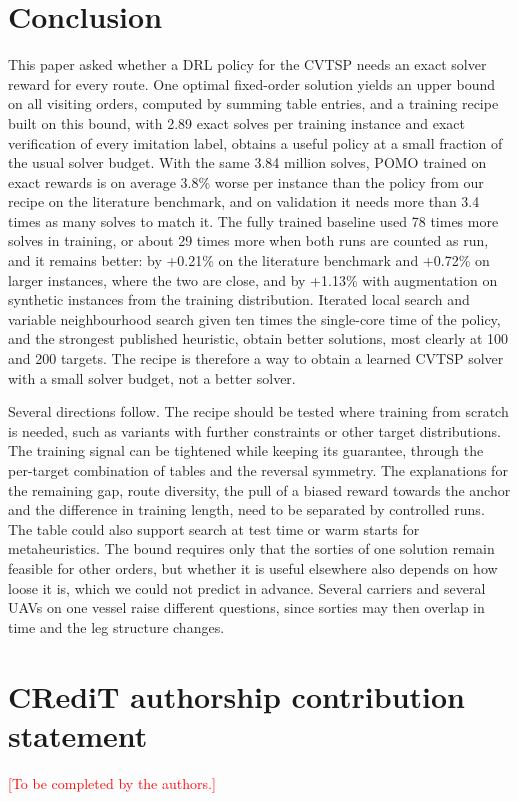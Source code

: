 \documentclass[preprint,12pt,authoryear]{elsarticle}
\newcommand{\placeholder}[1]{\textcolor{red}{[#1]}}
\begin{document}
\section{Conclusion}
\label{sec:conclusion}

This paper asked whether a DRL policy for the CVTSP needs an exact solver reward for every route. One optimal fixed-order solution yields an upper bound on all visiting orders, computed by summing table entries, and a training recipe built on this bound, with 2.89 exact solves per training instance and exact verification of every imitation label, obtains a useful policy at a small fraction of the usual solver budget. With the same 3.84 million solves, POMO trained on exact rewards is on average 3.8\% worse per instance than the policy from our recipe on the literature benchmark, and on validation it needs more than 3.4 times as many solves to match it. The fully trained baseline used 78 times more solves in training, or about 29 times more when both runs are counted as run, and it remains better: by +0.21\% on the literature benchmark and +0.72\% on larger instances, where the two are close, and by +1.13\% with augmentation on synthetic instances from the training distribution. Iterated local search and variable neighbourhood search given ten times the single-core time of the policy, and the strongest published heuristic, obtain better solutions, most clearly at 100 and 200 targets. The recipe is therefore a way to obtain a learned CVTSP solver with a small solver budget, not a better solver.

Several directions follow. The recipe should be tested where training from scratch is needed, such as variants with further constraints or other target distributions. The training signal can be tightened while keeping its guarantee, through the per-target combination of tables and the reversal symmetry. The explanations for the remaining gap, route diversity, the pull of a biased reward towards the anchor and the difference in training length, need to be separated by controlled runs. The table could also support search at test time or warm starts for metaheuristics. The bound requires only that the sorties of one solution remain feasible for other orders, but whether it is useful elsewhere also depends on how loose it is, which we could not predict in advance. Several carriers \citep{fahradyan2020} and several UAVs on one vessel \citep{ren2026} raise different questions, since sorties may then overlap in time and the leg structure changes.

\section*{CRediT authorship contribution statement}
\placeholder{To be completed by the authors.}
\end{document}
